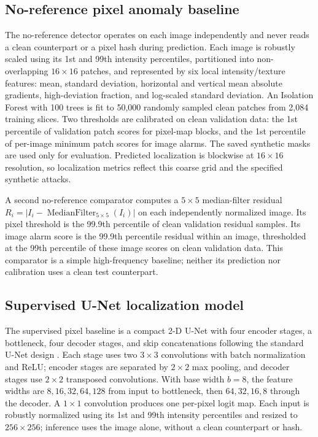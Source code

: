 \documentclass[journal]{IEEEtran}
\begin{document}
  \subsection{No-reference pixel anomaly baseline}
  The no-reference detector operates on each image independently and never reads a clean counterpart or a pixel hash during prediction. Each image is robustly scaled using its 1st and 99th intensity percentiles, partitioned into non-overlapping $16\times16$ patches, and represented by six local intensity/texture features: mean, standard deviation, horizontal and vertical mean absolute gradients, high-deviation fraction, and log-scaled standard deviation. An Isolation Forest with 100 trees is fit to 50,000 randomly sampled clean patches from 2,084 training slices. Two thresholds are calibrated on clean validation data: the 1st percentile of validation patch scores for pixel-map blocks, and the 1st percentile of per-image minimum patch scores for image alarms. The saved synthetic masks are used only for evaluation. Predicted localization is blockwise at $16\times16$ resolution, so localization metrics reflect this coarse grid and the specified synthetic attacks.
  
  A second no-reference comparator computes a $5\times5$ median-filter residual $R_i=|I_i-\operatorname{MedianFilter}_{5\times5}(I_i)|$ on each independently normalized image. Its pixel threshold is the 99.9th percentile of clean validation residual samples. Its image alarm score is the 99.9th percentile residual within an image, thresholded at the 99th percentile of these image scores on clean validation data. This comparator is a simple high-frequency baseline; neither its prediction nor calibration uses a clean test counterpart.
  
  \subsection{Supervised U-Net localization model}
  The supervised pixel baseline is a compact 2-D U-Net with four encoder stages, a bottleneck, four decoder stages, and skip concatenations following the standard U-Net design \cite{ronneberger2015}. Each stage uses two $3\times3$ convolutions with batch normalization and ReLU; encoder stages are separated by $2\times2$ max pooling, and decoder stages use $2\times2$ transposed convolutions. With base width $b=8$, the feature widths are $8,16,32,64,128$ from input to bottleneck, then $64,32,16,8$ through the decoder. A $1\times1$ convolution produces one per-pixel logit map. Each input is robustly normalized using its 1st and 99th intensity percentiles and resized to $256\times256$; inference uses the image alone, without a clean counterpart or hash.
\end{document}
